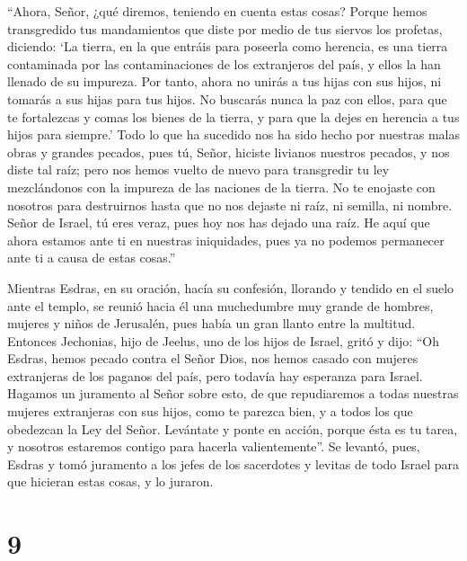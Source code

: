  ``Ahora, Señor, ¿qué diremos, teniendo en cuenta estas
cosas? Porque hemos transgredido tus mandamientos que diste por medio de
tus siervos los profetas, diciendo:  `La tierra, en la
que entráis para poseerla como herencia, es una tierra contaminada por
las contaminaciones de los extranjeros del país, y ellos la han llenado
de su impureza.  Por tanto, ahora no unirás a tus hijas
con sus hijos, ni tomarás a sus hijas para tus hijos.  No
buscarás nunca la paz con ellos, para que te fortalezcas y comas los
bienes de la tierra, y para que la dejes en herencia a tus hijos para
siempre.'  Todo lo que ha sucedido nos ha sido hecho por
nuestras malas obras y grandes pecados, pues tú, Señor, hiciste livianos
nuestros pecados,  y nos diste tal raíz; pero nos hemos
vuelto de nuevo para transgredir tu ley mezclándonos con la impureza de
las naciones de la tierra.  No te enojaste con nosotros
para destruirnos hasta que no nos dejaste ni raíz, ni semilla, ni
nombre.  Señor de Israel, tú eres veraz, pues hoy nos has
dejado una raíz.  He aquí que ahora estamos ante ti en
nuestras iniquidades, pues ya no podemos permanecer ante ti a causa de
estas cosas.''

 Mientras Esdras, en su oración, hacía su confesión,
llorando y tendido en el suelo ante el templo, se reunió hacia él una
muchedumbre muy grande de hombres, mujeres y niños de Jerusalén, pues
había un gran llanto entre la multitud.  Entonces
Jechonias, hijo de Jeelus, uno de los hijos de Israel, gritó y dijo:
``Oh Esdras, hemos pecado contra el Señor Dios, nos hemos casado con
mujeres extranjeras de los paganos del país, pero todavía hay esperanza
para Israel.  Hagamos un juramento al Señor sobre esto,
de que repudiaremos a todas nuestras mujeres extranjeras con sus hijos,
 como te parezca bien, y a todos los que obedezcan la Ley
del Señor.  Levántate y ponte en acción, porque ésta es
tu tarea, y nosotros estaremos contigo para hacerla valientemente''.
 Se levantó, pues, Esdras y tomó juramento a los jefes de
los sacerdotes y levitas de todo Israel para que hicieran estas cosas, y
lo juraron.

\hypertarget{section-8}{%
\section{9}\label{section-8}}

